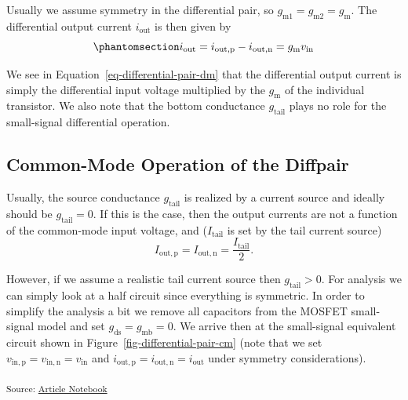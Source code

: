 \documentclass[
  a4paper,
  DIV=11,
  numbers=noendperiod]{scrartcl}
\begin{document}
Usually we assume symmetry in the differential pair, so
\(g_\mathrm{m1} = g_\mathrm{m2} = g_\mathrm{m}\). The differential
output current \(i_\mathrm{out}\) is then given by
\begin{equation}\phantomsection\label{eq-differential-pair-dm}{
i_\mathrm{out} = i_\mathrm{out,p} - i_\mathrm{out,n} = g_\mathrm{m}v_\mathrm{in}
}\end{equation}

We see in Equation~\ref{eq-differential-pair-dm} that the differential
output current is simply the differential input voltage multiplied by
the \(g_\mathrm{m}\) of the individual transistor. We also note that the
bottom conductance \(g_\mathrm{tail}\) plays no role for the
small-signal differential operation.

\subsection{Common-Mode Operation of the
Diffpair}\label{common-mode-operation-of-the-diffpair}

Usually, the source conductance \(g_\mathrm{tail}\) is realized by a
current source and ideally should be \(g_\mathrm{tail} = 0\). If this is
the case, then the output currents are not a function of the common-mode
input voltage, and (\(I_\mathrm{tail}\) is set by the tail current
source) \[
I_\mathrm{out,p} = I_\mathrm{out,n} = \frac{I_\mathrm{tail}}{2}.
\]

However, if we assume a realistic tail current source then
\(g_\mathrm{tail} > 0\). For analysis we can simply look at a half
circuit since everything is symmetric. In order to simplify the analysis
a bit we remove all capacitors from the MOSFET small-signal model and
set \(g_\mathrm{ds}= g_\mathrm{mb}= 0\). We arrive then at the
small-signal equivalent circuit shown in
Figure~\ref{fig-differential-pair-cm} (note that we set
\(v_\mathrm{in,p} = v_\mathrm{in,n} = v_\mathrm{in}\) and
\(i_\mathrm{out,p} = i_\mathrm{out,n} = i_\mathrm{out}\) under symmetry
considerations).

\textsubscript{Source:
\href{https://iic-jku.github.io/analog-circuit-design/index.qmd.html}{Article
Notebook}}
\end{document}
